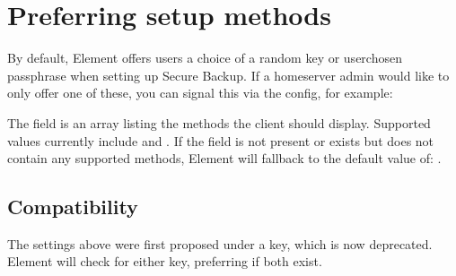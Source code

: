 \documentclass[letterpaper,10pt,openany,oneside,english]{sphinxmanual}
\begin{document}
\begin{sphinxVerbatim}[commandchars=\\\{\}]
   
     
\end{sphinxVerbatim}


\chapter{Preferring setup methods}
\label{\detokenize{e2ee:preferring-setup-methods}}
\sphinxAtStartPar
By default, Element offers users a choice of a random key or user\sphinxhyphen{}chosen
passphrase when setting up Secure Backup. If a homeserver admin would like to
only offer one of these, you can signal this via the
 config, for example:

\begin{sphinxVerbatim}[commandchars=\\\{\}]
   
     \PYG{p}{[}\PYG{p}{]}
\end{sphinxVerbatim}

\sphinxAtStartPar
The field  is an array listing the methods the
client should display. Supported values currently include  and
. If the  field is not present or
exists but does not contain any supported methods, Element will fallback to the
default value of: .


\section{Compatibility}
\label{\detokenize{e2ee:compatibility}}
\sphinxAtStartPar
The settings above were first proposed under a  key, which
is now deprecated. Element will check for either key, preferring
 if both exist.
\end{document}

